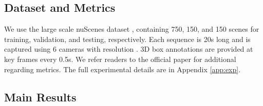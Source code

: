 \documentclass[runningheads, hyperfootnotes=false]{article}
\begin{document}
\subsection{Dataset and Metrics}
We use the large scale nuScenes dataset \cite{nuscenes2019}, containing 750, 150, and 150 scenes for training, validation, and testing, respectively. Each sequence is 20s long and is captured using 6 cameras with resolution . 3D box annotations are provided at key frames every 0.5s. We refer readers to the official paper \cite{nuscenes2019} for additional regarding metrics. The full experimental details are in Appendix \ref{app:exp}.

\subsection{Main Results}
\begin{table*}
\centering
\captionsetup{aboveskip=2pt}\captionsetup{belowskip=0pt}
\label{tab:main_val_set}
\tiny
{}
\end{table*}
\end{document}
